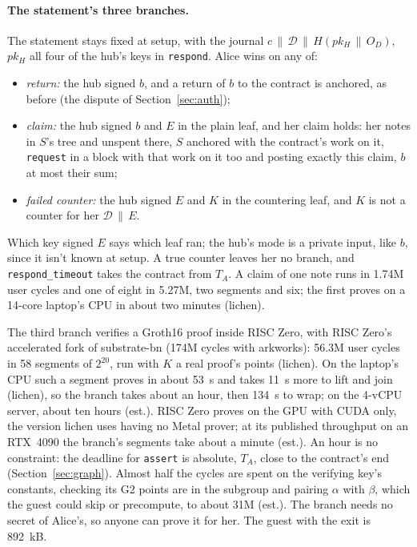 \documentclass[11pt]{article}
\newcommand{\tx}[1]{\texttt{#1}}
\begin{document}
\paragraph{The statement's three branches.} The statement stays fixed at
setup, with the journal $c \,\|\, \mathcal{D} \,\|\, H(pk_H \,\|\, O_D)$,
$pk_H$ all four of the hub's keys in \tx{respond}. Alice wins on any of:
\begin{itemize}[leftmargin=1.5em]
\item \emph{return:} the hub signed $b$, and a return of $b$ to the
  contract is anchored, as before (the dispute of
  Section~\ref{sec:auth});
\item \emph{claim:} the hub signed $b$ and $E$ in the plain leaf, and her
  claim holds: her notes in $S$'s tree and unspent there, $S$ anchored
  with the contract's work on it, \tx{request} in a block with that work
  on it too and posting exactly this claim, $b$ at most their sum;
\item \emph{failed counter:} the hub signed $E$ and $K$ in the countering
  leaf, and $K$ is not a counter for her $\mathcal{D} \,\|\, E$.
\end{itemize}
Which key signed $E$ says which leaf ran; the hub's mode is a private
input, like $b$, since it isn't known at setup. A true counter leaves
her no branch, and \tx{respond\_timeout} takes the contract from $T_A$.
A claim of one note runs in 1.74M user cycles and one of eight in 5.27M,
two segments and six; the first proves on a 14-core laptop's CPU in about
two minutes (lichen).

The third branch verifies a Groth16 proof inside RISC Zero, with RISC
Zero's accelerated fork of substrate-bn (174M cycles with arkworks): 56.3M
user cycles in 58 segments of $2^{20}$, run with $K$ a real proof's points
(lichen). On the laptop's CPU such a segment proves in about 53~s and
takes 11~s more to lift and join (lichen), so the branch takes about an
hour, then 134~s to wrap; on the 4-vCPU server, about ten hours (est.).
RISC Zero proves on the GPU with CUDA only, the version lichen uses having
no Metal prover; at its published throughput on an RTX~4090 the branch's
segments take about a minute (est.). An hour is no constraint: the
deadline for \tx{assert} is absolute, $T_A$, close to the contract's end
(Section~\ref{sec:graph}). Almost half the cycles are spent on the
verifying key's constants, checking its G2 points are in the subgroup and
pairing $\alpha$ with $\beta$, which the guest could skip or precompute,
to about 31M (est.). The branch needs no secret of Alice's, so anyone can
prove it for her. The guest with the exit is 892~kB.
\end{document}
